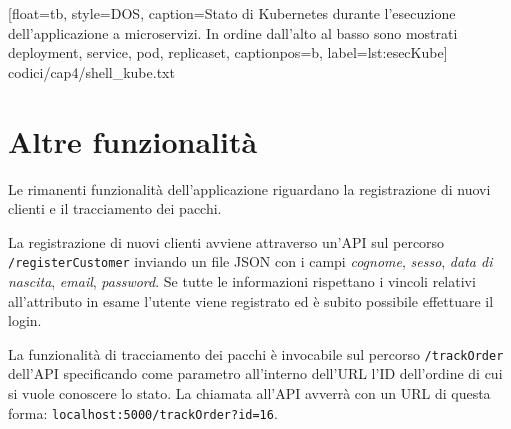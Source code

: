 		[float=tb,
		style=DOS,
		caption={Stato di Kubernetes durante l'esecuzione dell'applicazione a microservizi.
			In ordine dall'alto al basso sono mostrati deployment, service, pod, replicaset},
			captionpos=b,
			label=lst:esecKube]%
		{codici/cap4/shell_kube.txt}
		
	
\section{Altre funzionalità}

	Le rimanenti funzionalità dell'applicazione riguardano la registrazione di nuovi clienti e il tracciamento dei pacchi.
	
	La registrazione di nuovi clienti avviene attraverso un'API sul percorso \texttt{/registerCustomer} inviando un file JSON con i campi \emph{cognome}, \emph{sesso}, \emph{data di nascita}, \emph{email}, \emph{password}.
	Se tutte le informazioni rispettano i vincoli relativi all'attributo in esame l'utente viene registrato ed è subito possibile effettuare il login.
	
	La funzionalità di tracciamento dei pacchi è invocabile sul percorso \texttt{/trackOrder} dell'API specificando come parametro all'interno dell'URL l'ID dell'ordine di cui si vuole conoscere lo stato.
	La chiamata all'API avverrà con un URL di questa forma: \texttt{localhost:5000/trackOrder?id=16}.


